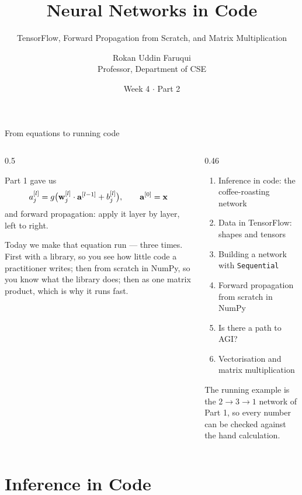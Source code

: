 \documentclass[aspectratio=169,10pt]{beamer}
\title[CSE 815 -- Week 4, Part 2]{Neural Networks in Code}
\subtitle{TensorFlow, Forward Propagation from Scratch, and Matrix Multiplication}
\author{Rokan Uddin Faruqui\\ \small Professor, Department of CSE}
\institute{\small University of Chittagong \\ \texttt{rufaruqui@cu.ac.bd}}
\date[Week 4 / Part 2]{Week 4 $\cdot$ Part 2}
\begin{document}
\begin{frame}
  \titlepage
\end{frame}

\begin{frame}{From equations to running code}
  \begin{columns}[T,onlytextwidth]
    \begin{column}{0.5\textwidth}
      \begin{block}{Part 1 gave us}
        \[ a^{[l]}_j = g\bigl(\mathbf{w}^{[l]}_j\cdot\mathbf{a}^{[l-1]} + b^{[l]}_j\bigr),\qquad
           \mathbf{a}^{[0]}=\mathbf{x} \]
        and forward propagation: apply it layer by layer, left to right.
      \end{block}
      \footnotesize
      Today we make that equation run --- three times. First with a library, so you see how
      little code a practitioner writes; then from scratch in NumPy, so you know what the
      library does; then as one matrix product, which is why it runs fast.
    \end{column}
    \begin{column}{0.46\textwidth}
      \begin{keyidea}[Today]
        \footnotesize
        \begin{enumerate}
          \item Inference in code: the coffee-roasting network
          \item Data in TensorFlow: shapes and tensors
          \item Building a network with \texttt{Sequential}
          \item Forward propagation from scratch in NumPy
          \item Is there a path to AGI?
          \item Vectorisation and matrix multiplication
        \end{enumerate}
      \end{keyidea}
      \footnotesize The running example is the $2\to3\to1$ network of Part 1, so every number
      can be checked against the hand calculation.
    \end{column}
  \end{columns}
\end{frame}

\section{Inference in Code}
\end{document}
